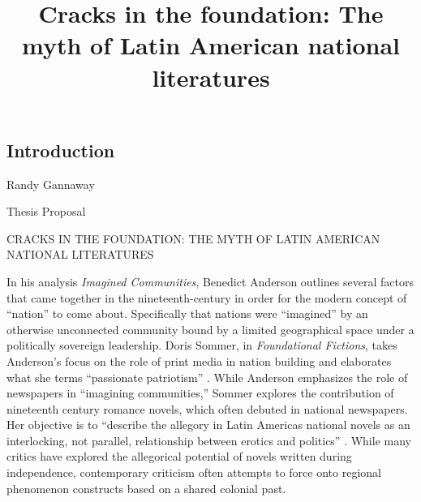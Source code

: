 \documentclass[12pt]{report}
\title{Cracks in the foundation: The myth of Latin American national literatures}
\begin{document}
\begin{singlespace}
	\chapter{Introduction}
\end{singlespace}


\noindent
Randy Gannaway

\noindent
Thesis Proposal

\begin{center}
CRACKS IN THE FOUNDATION: THE MYTH OF LATIN AMERICAN NATIONAL LITERATURES
\end{center}

In his analysis \textit{Imagined Communities}, Benedict Anderson outlines several factors that came together in the nineteenth-century in order for the modern concept of \enquote{nation} to come about. 
Specifically that nations were \enquote{imagined} by an otherwise unconnected community bound by a limited geographical space under a politically sovereign leadership\nocite{Anderson2006}. 
Doris Sommer, in \textit{Foundational Fictions}, takes Anderson's focus on the role of print media in nation building and elaborates what she terms \enquote{passionate patriotism} \autocite*[33]{Sommer1991}. 
While Anderson emphasizes the role of newspapers in \enquote{imagining communities,} Sommer explores the contribution of nineteenth century romance novels, which often debuted in national newspapers. 
Her objective is to \enquote{describe the allegory in Latin Americas national novels as an interlocking, not parallel, relationship between erotics and politics} \autocite[43]{Sommer1991}. 
While many critics have explored the allegorical potential of novels written during independence, contemporary criticism often attempts to force onto regional phenomenon constructs based on a shared colonial past.
\end{document}
